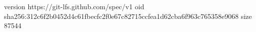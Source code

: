 version https://git-lfs.github.com/spec/v1
oid sha256:312c6f2b0452d4c61fbecfc2f0e67c82715ccfea1d62cba6f963c765358e9068
size 87544
